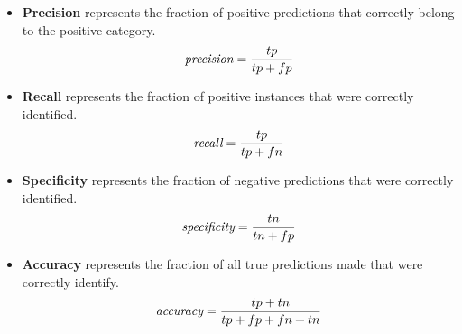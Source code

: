 \begin{itemize}
  \item \textbf{Precision} represents the fraction of positive predictions that correctly belong to the positive category.
  \begin{equation}
    \emph{$\text{precision} = \frac{tp}{tp + fp}$}
    \label{equ:precision}
  \end{equation}

  \item \textbf{Recall} represents the fraction of positive instances that were correctly identified.
  \begin{equation}
    \emph{$\text{recall} = \frac{tp}{tp + fn}$}
    \label{equ:recall}
  \end{equation}

  \item \textbf{Specificity} represents the fraction of negative predictions that were correctly identified.
  \begin{equation}
    \emph{$\text{specificity} = \frac{tn}{tn + fp}$}
    \label{equ:specificity}
  \end{equation}

  \item \textbf{Accuracy} represents the fraction of all true predictions made that were correctly identify.
  \begin{equation}
    \emph{$\text{accuracy} = \frac{tp + tn}{tp + fp + fn + tn}$}
    \label{equ:accuracy}
  \end{equation}
\end{itemize}


